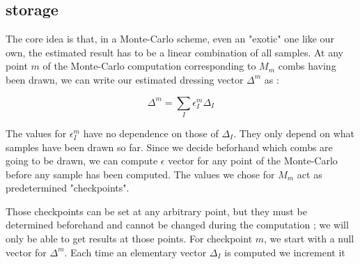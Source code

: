 \documentclass[./thesis.tex]{subfiles}
\begin{document}
\subsection{storage}

The core idea is that, in a Monte-Carlo scheme, even an "exotic" one like our own, the estimated result has to be a linear combination of all samples. At any point $m$ of the Monte-Carlo computation corresponding to $M_m$ combs having been drawn, we can write our estimated dressing vector $\Delta^m$ as :


\begin{equation}
\Delta^m = \sum_{I} \epsilon^m_{I} \Delta_I
\end{equation}


The values for $\epsilon^m_I$ have no dependence on those of $\Delta_I$. They only depend on what samples have been drawn so far. Since we decide beforhand which combs are going to be drawn, we can compute $\epsilon$ vector for any point of the Monte-Carlo before any sample has been computed. The values we chose for $M_m$ act as predetermined "checkpoints".

Those checkpoints can be set at any arbitrary point, but they must be determined beforehand and cannot be changed during the computation ; we will only be able to get results at those points.
For checkpoint $m$, we start with a null vector for $\Delta^m$. Each time an elementary vector $\Delta_I$ is computed
we increment it 
\end{document}
